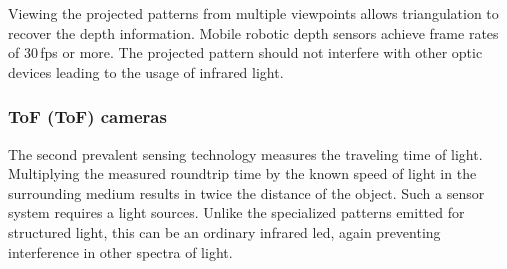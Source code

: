 Viewing the projected patterns from multiple viewpoints allows triangulation to recover the depth information.
Mobile robotic depth sensors achieve frame rates of 30\,\acrshort{fps} or more.
The projected pattern should not interfere with other optic devices leading to the usage of infrared light.

\subsubsection{\acrlong{ToF} (\acrshort{ToF}) cameras}

The second prevalent sensing technology measures the traveling time of light\cite[p. 27-41]{hansard_springer2012}.
Multiplying the measured roundtrip time by the known speed of light in the surrounding medium results in twice the distance of the object.
Such a sensor system requires a light sources.
Unlike the specialized patterns emitted for structured light, this can be an ordinary infrared \acrshort{led}, again preventing interference in other spectra of light.
